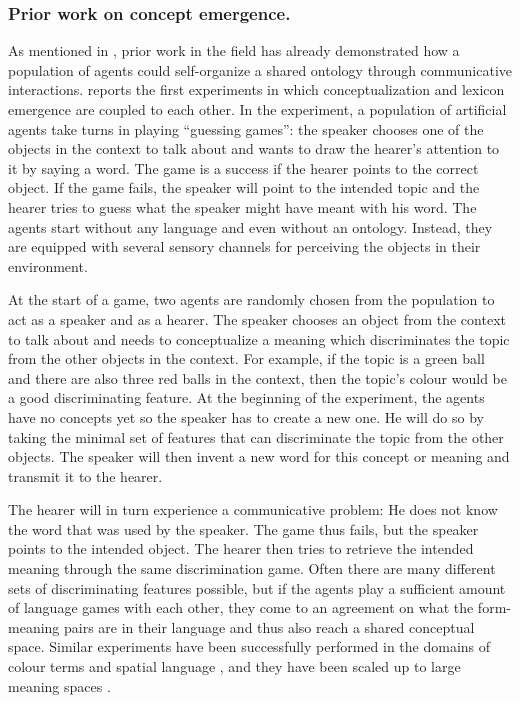 \subsubsection{Prior work on concept emergence.}

As mentioned in , prior work in the field has already demonstrated how a population of agents could self-organize a shared ontology through communicative interactions. \citet{steels97constructing} reports the first experiments in which conceptualization and lexicon emergence are coupled to each other. In the experiment, a population of artificial agents take turns in playing ``guessing games'': the speaker chooses one of the objects in the context to talk about and wants to draw the hearer's attention to it by saying a word. The game is a success if the hearer points to the correct object. If the game fails, the speaker will point to the intended topic and the hearer tries to guess what the speaker might have meant with his word. The agents start without any language and even without an ontology. Instead, they are equipped with several sensory channels for perceiving the objects in their environment.

At the start of a game, two agents are randomly chosen from the population to act as a speaker and as a hearer. The speaker chooses an object from the context to talk about and needs to conceptualize a meaning which discriminates the topic from the other objects in the context. For example, if the topic is a green ball and there are also three red balls in the context, then the topic's colour would be a good discriminating feature. At the beginning of the experiment, the agents have no concepts yet so the speaker has to create a new one. He will do so by taking the minimal set of features that can discriminate the topic from the other objects. The speaker will then invent a new word for this concept or meaning and transmit it to the hearer.

The hearer will in turn experience a communicative problem: He does not know the word that was used by the speaker. The game thus fails, but the speaker points to the intended object. The hearer then tries to retrieve the intended meaning through the same discrimination game. Often there are many different sets of discriminating features possible, but if the agents play a sufficient amount of language games with each other, they come to an agreement on what the form-meaning pairs are in their language and thus also reach a shared conceptual space. Similar experiments have been successfully performed in the domains of colour terms \citep{steels05coordinating} and spatial language \citep{steels08perspective-alignment}, and they have been scaled up to large meaning spaces \citep{wellens08coping}.



